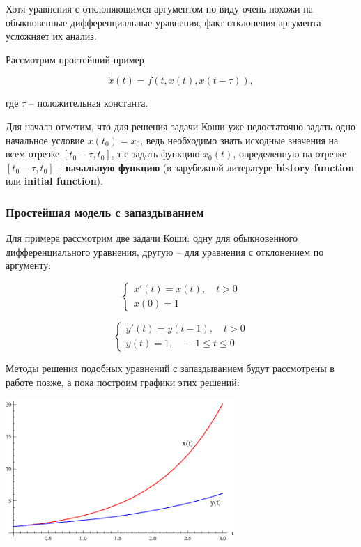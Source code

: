 Хотя уравнения с отклоняющимся аргументом по виду очень похожи на обыкновенные дифференциальные уравнения, факт отклонения аргумента усложняет их анализ.

Рассмотрим простейший пример

\begin{equation}\label{eq:example}
\dot{x}(t) = f(t,x(t),x(t-\tau)),
\end{equation}

где $\tau$ \--- положительная константа.

Для начала отметим, что для решения задачи Коши уже недостаточно задать одно начальное условие $x(t_0)=x_0$, ведь необходимо знать исходные значения на всем отрезке $[t_0-\tau,t_0]$, т.е задать функцию $x_0(t)$, определенную на отрезке $[t_0-\tau,t_0]$ \--- \textbf{начальную функцию} (в зарубежной литературе \textbf{history function} или \textbf{initial function}).

\subsubsection{Простейшая модель с запаздыванием}

Для примера рассмотрим две задачи Коши: одну для обыкновенного дифференциального уравнения, другую \--- для уравнения с отклонением по аргументу:

\begin{equation}\label{eq:no-delay}
\left\{
\begin{aligned}
x'(t) = x(t), \quad t>0\\
x(0) = 1
\end{aligned}
\right.
\end{equation}

\begin{equation}\label{eq:delay}
\left\{
\begin{aligned}
y'(t) = y(t-1), \quad t>0\\
y(t) = 1, \quad -1 \leq t \leq 0
\end{aligned}
\right.
\end{equation}

Методы решения подобных уравнений с запаздыванием будут рассмотрены в работе позже, а пока построим графики этих решений:

\begin{center}
\includegraphics[width=0.65\textwidth]{./1_modelling/comparison.eps}
\end{center}


